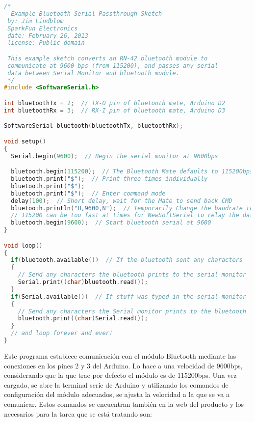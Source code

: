 \begin{lstlisting}[language=C++,breaklines]
/*
  Example Bluetooth Serial Passthrough Sketch
 by: Jim Lindblom
 SparkFun Electronics
 date: February 26, 2013
 license: Public domain

 This example sketch converts an RN-42 bluetooth module to
 communicate at 9600 bps (from 115200), and passes any serial
 data between Serial Monitor and bluetooth module.
 */
#include <SoftwareSerial.h>  

int bluetoothTx = 2;  // TX-O pin of bluetooth mate, Arduino D2
int bluetoothRx = 3;  // RX-I pin of bluetooth mate, Arduino D3

SoftwareSerial bluetooth(bluetoothTx, bluetoothRx);

void setup()
{
  Serial.begin(9600);  // Begin the serial monitor at 9600bps

  bluetooth.begin(115200);  // The Bluetooth Mate defaults to 115200bps
  bluetooth.print("$");  // Print three times individually
  bluetooth.print("$");
  bluetooth.print("$");  // Enter command mode
  delay(100);  // Short delay, wait for the Mate to send back CMD
  bluetooth.println("U,9600,N");  // Temporarily Change the baudrate to 9600, no parity
  // 115200 can be too fast at times for NewSoftSerial to relay the data reliably
  bluetooth.begin(9600);  // Start bluetooth serial at 9600
}

void loop()
{
  if(bluetooth.available())  // If the bluetooth sent any characters
  {
    // Send any characters the bluetooth prints to the serial monitor
    Serial.print((char)bluetooth.read());  
  }
  if(Serial.available())  // If stuff was typed in the serial monitor
  {
    // Send any characters the Serial monitor prints to the bluetooth
    bluetooth.print((char)Serial.read());
  }
  // and loop forever and ever!
}
\end{lstlisting}

Este programa establece comunicación con el módulo Bluetooth mediante las conexiones en los pines 2 y 3 del Arduino. Lo hace a una velocidad de 9600bps, considerando que la que trae por defecto el módulo es de 115200bps. Una vez cargado, se abre la terminal serie de Arduino y utilizando los comandos de configuración del módulo adecuados, se ajusta la velocidad a la que se va a comunicar. Estos comandos se encuentran también en la web del producto y los necesarios para la tarea que se está tratando son:

